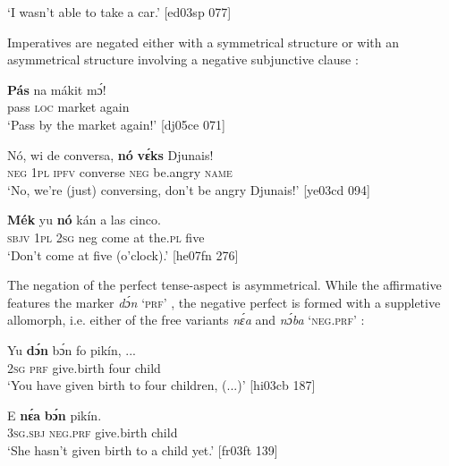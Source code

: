 \glt ‘I wasn’t able to take a car.’ [ed03sp 077]
\z

Imperatives  are negated either with a symmetrical structure  or with an asymmetrical structure involving a negative subjunctive clause : 


\ea%
    \label{ex:key:538}
    \gll \textbf{Pás}    na  mákit  mɔ́!\\
pass    \textsc{loc}  market  again\\

\glt ‘Pass by the market again!’ [dj05ce 071]
\z


\ea%
    \label{ex:key:539}
    \gll Nó,  wi  de  conversa,  \textbf{nó}  \textbf{vɛ́ks}    Djunais!\\
\textsc{neg}  \textsc{1pl}  \textsc{ipfv}  converse    \textsc{neg}  be.angry  \textsc{name}\\

\glt ‘No, we’re (just) conversing, don’t be angry Djunais!’ [ye03cd 094]
\z


\ea%
    \label{ex:key:540}
    \gll \textbf{Mék}    yu  \textbf{nó}  kán    a  las    cinco.\\
{\textsc{sbjv}  \textsc{1pl}}  \textsc{2sg}  neg  come  at  the.\textsc{pl}  five  \\

\glt ‘Don’t come at five (o’clock).’ [he07fn 276]
\z

The negation of the perfect tense-aspect is asymmetrical. While the affirmative features the marker \textit{dɔ́n} ‘\textsc{prf}’ , the negative perfect is formed with a suppletive allomorph, i.e. either of the free variants \textit{nɛ́a} and \textit{nɔ́ba} ‘\textsc{neg.prf}’ : 


\ea%
    \label{ex:key:541}
    \gll Yu  \textbf{dɔ́n}  bɔ́n      fo    pikín,  \op...\cp{}\\
\textsc{2sg}  \textsc{prf}  give.birth  four    child\\

\glt ‘You have given birth to four children, (...)’ [hi03cb 187]
\z


\ea%
    \label{ex:key:542}
    \gll E    \textbf{nɛ́a}    \textbf{bɔ́n}      pikín.\\
\textsc{3sg.sbj}  \textsc{neg}.\textsc{prf}  give.birth  child\\

\glt ‘She hasn’t given birth to a child yet.’ [fr03ft 139]
\z

